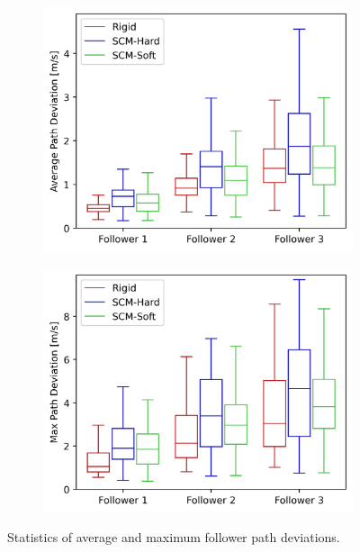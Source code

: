 \documentclass[12pt,twocolumn]{article}
\begin{document}
\begin{figure}
    \centering
    \begin{subfigure}{0.45\textwidth}
        \includegraphics[width=\columnwidth]{Figs/StatisticalAnalysis/metric_path_avg.png}
        \caption{} \label{fig:metricpathavg}
    \end{subfigure}
    \begin{subfigure}{0.45\textwidth}
        \includegraphics[width=\columnwidth]{Figs/StatisticalAnalysis/metric_path_max.png}
        \caption{} \label{fig:metricpathmax}
    \end{subfigure}%
    \caption{Statistics of average and maximum follower path deviations.}  
    \label{fig:metricpath}
\end{figure}
\end{document}
